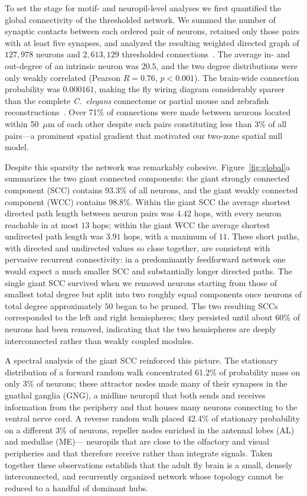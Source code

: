 \documentclass[11pt]{article}
\begin{document}
To set the stage for motif- and neuropil-level analyses we first quantified
the global connectivity of the thresholded network. We summed the number
of synaptic contacts between each ordered pair of neurons, retained only
those pairs with at least five synapses, and analyzed the resulting
weighted directed graph of $127{,}978$ neurons and $2{,}613{,}129$
thresholded connections~\cite{dorkenwald2024flywire}. The average in- and
out-degree of an intrinsic neuron was $20.5$, and the two degree
distributions were only weakly correlated (Pearson $R = 0.76$,
$p < 0.001$). The brain-wide connection probability was $0.000161$, making
the fly wiring diagram considerably sparser than the complete
\textit{C.\ elegans} connectome or partial mouse and zebrafish
reconstructions~\cite{varshney2011structural,cook2019whole,song2005highly,svara2022automated}.
Over 71\% of connections were made between neurons located within 50~$\mu$m
of each other despite such pairs constituting less than 3\% of all
pairs---a prominent spatial gradient that motivated our two-zone spatial
null model.

Despite this sparsity the network was remarkably cohesive.
Figure~\ref{fig:global}a summarizes the two giant connected components:
the giant strongly connected component (SCC) contains 93.3\% of all
neurons, and the giant weakly connected component (WCC) contains 98.8\%.
Within the giant SCC the average shortest directed path length between
neuron pairs was $4.42$ hops, with every neuron reachable in at most $13$
hops; within the giant WCC the average shortest undirected path length was
$3.91$ hops, with a maximum of $11$. These short paths, with directed and
undirected values so close together, are consistent with pervasive
recurrent connectivity: in a predominantly feedforward network one would
expect a much smaller SCC and substantially longer directed paths. The
single giant SCC survived when we removed neurons starting from those of
smallest total degree but split into two roughly equal components once
neurons of total degree approximately $50$ began to be pruned. The two
resulting SCCs corresponded to the left and right hemispheres; they
persisted until about 60\% of neurons had been removed, indicating that
the two hemispheres are deeply interconnected rather than weakly coupled
modules.

A spectral analysis of the giant SCC reinforced this picture. The
stationary distribution of a forward random walk concentrated 61.2\% of
probability mass on only 3\% of neurons; these attractor nodes made many
of their synapses in the gnathal ganglia (GNG), a midline neuropil that
both sends and receives information from the periphery and that houses
many neurons connecting to the ventral nerve cord. A reverse random walk
placed 42.4\% of stationary probability on a different 3\% of neurons,
repeller nodes enriched in the antennal lobes (AL) and medullae (ME)---
neuropils that are close to the olfactory and visual peripheries and that
therefore receive rather than integrate signals. Taken together these
observations establish that the adult fly brain is a small, densely
interconnected, and recurrently organized network whose topology cannot be
reduced to a handful of dominant hubs.
\end{document}
